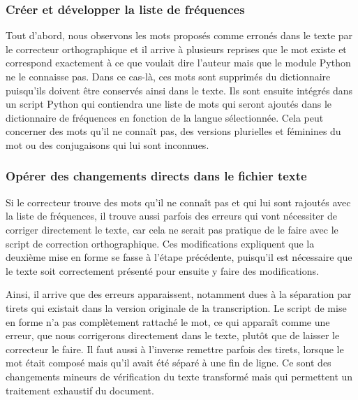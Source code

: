 \subsubsection{Créer et développer la liste de fréquences}
Tout d'abord, nous observons les mots proposés comme erronés dans le texte par le correcteur orthographique et il arrive à plusieurs reprises que le mot existe et correspond exactement à ce que voulait dire l'auteur mais que le module Python ne le connaisse pas. Dans ce cas-là, ces mots sont supprimés du dictionnaire puisqu'ils doivent être conservés ainsi dans le texte. Ils sont ensuite intégrés dans un script Python qui contiendra une liste de mots qui seront ajoutés dans le dictionnaire de fréquences en fonction de la langue sélectionnée. Cela peut concerner des mots qu'il ne connaît pas, des versions plurielles et féminines du mot ou des conjugaisons qui lui sont inconnues.

\subsubsection{Opérer des changements directs dans le fichier texte}
Si le correcteur trouve des mots qu'il ne connaît pas et qui lui sont rajoutés avec la liste de fréquences, il trouve aussi parfois des erreurs qui vont nécessiter de corriger directement le texte, car cela ne serait pas pratique de le faire avec le script de correction orthographique. Ces modifications expliquent que la deuxième mise en forme se fasse à l'étape précédente, puisqu'il est nécessaire que le texte soit correctement présenté pour ensuite y faire des modifications.

Ainsi, il arrive que des erreurs apparaissent, notamment dues à la séparation par tirets qui existait dans la version originale de la transcription. Le script de mise en forme n'a pas complètement rattaché le mot, ce qui apparaît comme une erreur, que nous corrigerons directement dans le texte, plutôt que de laisser le correcteur le faire. Il faut aussi à l'inverse remettre parfois des tirets, lorsque le mot était composé mais qu'il avait été séparé à une fin de ligne. Ce sont des changements mineurs de vérification du texte transformé mais qui permettent un traitement exhaustif du document.

